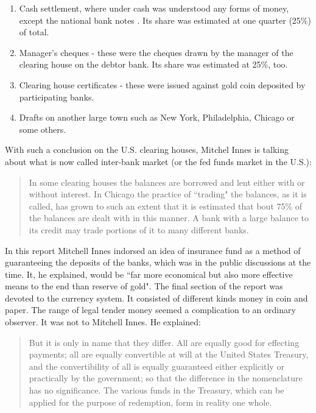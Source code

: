 \begin{enumerate}%
\item Cash settlement, where under cash was understood any forms of money, except the national bank notes . Its share was estimated at one quarter (25\%) of total.
\item Manager's cheques - these were the cheques drawn by the manager of the clearing house on the debtor bank. Its share was estimated at 25\%, too.
\item Clearing house certificates - these were issued against gold coin deposited by participating banks.
\item Drafts on another large town such as New York, Philadelphia, Chicago or some others. 
\end{enumerate}

With such a conclusion on the U.S. clearing houses, Mitchel Innes is talking about what is now called inter-bank market (or the fed funds market in the U.S.):

\begin{quote}
In some clearing houses the balances are borrowed and lent either with or without interest. In Chicago the practice of ``trading" the balances, as it is called, has grown to such an extent that it is estimated that bout 75\% of the balances are dealt with in this manner. A bank with a large balance to its credit may trade portions of it to many different banks. \citep{innes1910}
\end{quote}

In this report Mitchell Innes indorsed an idea of insurance fund as a method of guaranteeing the deposits of the banks, which was in the public discussions at the time. It, he explained, would be ``far more economical but also more effective means to the end than reserve of gold".
The final section of the report was devoted to the currency system. It consisted of different kinds money in coin and paper. The range of legal tender money seemed a complication to an ordinary observer. It was not to Mitchell Innes. He explained:

\begin{quote}
But it is only in name that they differ. All are equally good for effecting payments; all are equally convertible at will at the United States Treasury, and the convertibility of all is equally guaranteed either explicitly or practically by the government; so that the difference in the nomenclature has no significance. The various funds in the Treasury, which can be applied for the purpose of redemption, form in reality one whole. \citep{innes1910}
\end{quote}

